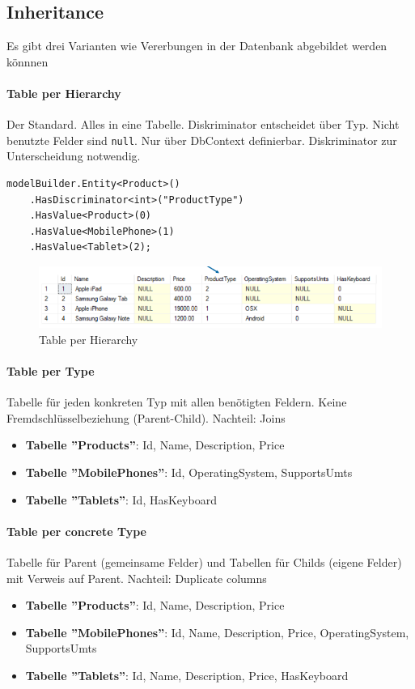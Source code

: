 \documentclass[
a4paper,
oneside,
10pt,
fleqn,
headsepline,
toc=listofnumbered, 
bibliography=totocnumbered]{scrartcl}
\begin{document}
\subsection{Inheritance}
Es gibt drei Varianten wie Vererbungen in der Datenbank abgebildet werden könnnen

\paragraph{Table per Hierarchy} Der Standard. Alles in eine Tabelle. Diskriminator entscheidet über Typ. Nicht benutzte Felder sind \lstinline|null|. Nur über DbContext definierbar. Diskriminator zur Unterscheidung notwendig.
\begin{lstlisting}
modelBuilder.Entity<Product>()
    .HasDiscriminator<int>("ProductType")
    .HasValue<Product>(0)
    .HasValue<MobilePhone>(1)
    .HasValue<Tablet>(2);
\end{lstlisting}
\begin{figure}[!ht]
	\centering
	\includegraphics[width=0.8\linewidth]{images/table_per_hierarchy.png}
	\caption{Table per Hierarchy}
\end{figure}

\paragraph{Table per Type} Tabelle für jeden konkreten Typ mit allen benötigten Feldern. Keine Fremdschlüsselbeziehung (Parent-Child). Nachteil: Joins
\begin{itemize}
	\item \textbf{Tabelle ''Products''}: Id, Name, Description, Price
	\item \textbf{Tabelle ''MobilePhones''}: Id, OperatingSystem, SupportsUmts
	\item \textbf{Tabelle ''Tablets''}: Id, HasKeyboard
\end{itemize}

\paragraph{Table per concrete Type} Tabelle für Parent (gemeinsame Felder) und Tabellen für Childs (eigene Felder) mit Verweis auf Parent. Nachteil: Duplicate columns
\begin{itemize}
	\item \textbf{Tabelle ''Products''}: Id, Name, Description, Price
	\item \textbf{Tabelle ''MobilePhones''}: Id, Name, Description, Price, OperatingSystem, SupportsUmts
	\item \textbf{Tabelle ''Tablets''}: Id, Name, Description, Price, HasKeyboard
\end{itemize}
\end{document}
